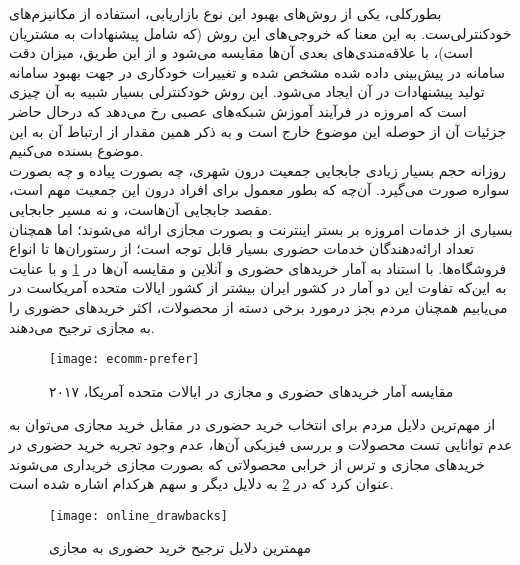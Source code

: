 بطورکلی، یکی از روش‌های بهبود این نوع بازاریابی، استفاده از مکانیزم‌های خودکنترلی‌ست. به این معنا که خروجی‌های این روش (که شامل پیشنهادات به مشتریان است)، با علاقه‌مندی‌های بعدی آن‌ها مقایسه می‌شود و از این طریق، میزان دقت سامانه در پیش‌بینی داده شده مشخص شده و تغییرات خودکاری در جهت بهبود سامانه تولید پیشنهادات در آن ایجاد می‌شود. این روش خودکنترلی بسیار شبیه به آن چیزی است که امروزه در فرآیند آموزش شبکه‌های عصبی رخ می‌دهد که درحال حاضر جزئیات آن از حوصله این موضوع خارج است و به ذکر همین مقدار از ارتباط آن به این موضوع بسنده می‌کنیم\cite{marketing1}.\\


روزانه حجم بسیار زیادی جابجایی جمعیت درون شهری، چه بصورت پیاده و چه بصورت سواره صورت می‌گیرد. آن‌چه که بطور معمول برای افراد درون این جمعیت مهم است، مقصد جابجایی آن‌هاست، و نه مسیر جابجایی.\\

بسیاری از خدمات امروزه بر بستر اینترنت و بصورت مجازی ارائه می‌شوند؛ اما همچنان تعداد ارائه‌دهندگان خدمات حضوری بسیار قابل توجه است؛ از رستوران‌ها تا انواع فروشگاه‌ها. با استناد به آمار خریدهای حضوری و آنلاین و مقایسه آن‌ها در
\cref{fig.2}
و با عنایت به این‌که تفاوت این دو آمار در کشور ایران بیشتر از کشور ایالات متحده آمریکاست در می‌یابیم همچنان مردم بجز درمورد برخی دسته از محصولات، اکثر خریدهای حضوری را به مجازی ترجیح می‌دهند\cite{marketing4}.\\

\begin{figure}[H]
	\centering\texttt{[image: ecomm-prefer]}
	\caption{مقایسه آمار خریدهای حضوری و مجازی در ایالات متحده آمریکا، ۲۰۱۷\cite{marketing4}}\label{fig.2}
\end{figure}

از مهم‌ترین دلایل مردم برای انتخاب خرید حضوری در مقابل خرید مجازی می‌توان به عدم توانایی تست محصولات و بررسی فیزیکی آن‌ها، عدم وجود تجربه خرید حضوری در خریدهای مجازی و ترس از خرابی محصولاتی که بصورت مجازی خریداری می‌شوند عنوان کرد که در
\cref{fig.3}
به دلایل دیگر و سهم هرکدام اشاره شده است.\cite{marketing5}
\begin{figure}[H]
	\centering\texttt{[image: online\_drawbacks]}
	\caption{مهمترین دلایل ترجیح خرید حضوری به مجازی\cite{marketingimage2}}\label{fig.3}
\end{figure}
\newpage

